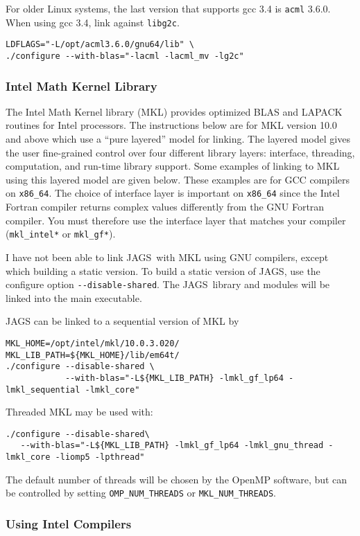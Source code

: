 \documentclass[11pt, a4paper, titlepage]{article}
\newcommand{\JAGS}{\textsf{JAGS}}
\begin{document}
For older Linux systems, the last version that supports gcc 3.4 is
\texttt{acml} 3.6.0. When using gcc 3.4, link against \texttt{libg2c}.
\begin{verbatim}
LDFLAGS="-L/opt/acml3.6.0/gnu64/lib" \
./configure --with-blas="-lacml -lacml_mv -lg2c"
\end{verbatim}

\subsubsection{Intel Math Kernel Library}

The Intel Math Kernel library (MKL) provides optimized BLAS and LAPACK
routines for Intel processors. The instructions below are for MKL
version 10.0 and above which use a ``pure layered'' model for linking.
The layered model gives the user fine-grained control over four
different library layers: interface, threading, computation, and
run-time library support. Some examples of linking to MKL using this
layered model are given below. These examples are for GCC compilers on
\verb+x86_64+. The choice of interface layer is important on
\verb+x86_64+ since the Intel Fortran compiler returns complex values
differently from the GNU Fortran compiler. You must therefore use the
interface layer that matches your compiler (\verb+mkl_intel*+ or
\verb+mkl_gf*+).

I have not been able to link \JAGS\ with MKL using GNU compilers, except
which building a static version. To build a static version of \JAGS,
use the configure option \verb+--disable-shared+. The \JAGS\ library and
modules will be linked into the main executable.

JAGS can be linked to a sequential version of MKL by
\begin{verbatim}
MKL_HOME=/opt/intel/mkl/10.0.3.020/
MKL_LIB_PATH=${MKL_HOME}/lib/em64t/
./configure --disable-shared \
            --with-blas="-L${MKL_LIB_PATH} -lmkl_gf_lp64 -lmkl_sequential -lmkl_core"
\end{verbatim}

Threaded MKL may be used with:
\begin{verbatim}
./configure --disable-shared\
   --with-blas="-L${MKL_LIB_PATH} -lmkl_gf_lp64 -lmkl_gnu_thread -lmkl_core -liomp5 -lpthread"
\end{verbatim}
The default number of threads will be chosen by the OpenMP software,
but can be controlled by setting \verb+OMP_NUM_THREADS+ or \verb+MKL_NUM_THREADS+.

\subsubsection{Using Intel Compilers}
\end{document}
